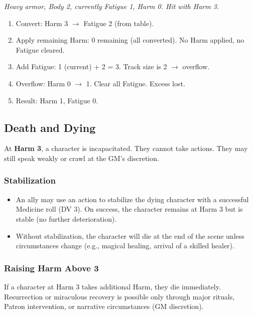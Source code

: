 \textit{Heavy armor, Body 2, currently Fatigue 1, Harm 0. Hit with Harm 3.}

\begin{enumerate}
  \item Convert: Harm 3 $\rightarrow$ Fatigue 2 (from table).
  \item Apply remaining Harm: 0 remaining (all converted). No Harm applied, no Fatigue cleared.
  \item Add Fatigue: 1 (current) + 2 = 3. Track size is 2 $\rightarrow$ overflow.
  \item Overflow: Harm 0 $\rightarrow$ 1. Clear all Fatigue. Excess lost.
  \item Result: Harm 1, Fatigue 0.
\end{enumerate}

\subsection{Death and Dying}

At \textbf{Harm 3}, a character is incapacitated. They cannot take actions. They may still speak weakly or crawl at the GM's discretion.

\subsubsection{Stabilization}
\begin{itemize}
  \item An ally may use an action to stabilize the dying character with a successful Medicine roll (DV 3). On success, the character remains at Harm 3 but is stable (no further deterioration).
  \item Without stabilization, the character will die at the end of the scene unless circumstances change (e.g., magical healing, arrival of a skilled healer).
\end{itemize}

\subsubsection{Raising Harm Above 3}
If a character at Harm 3 takes additional Harm, they die immediately. Resurrection or miraculous recovery is possible only through major rituals, Patron intervention, or narrative circumstances (GM discretion).

